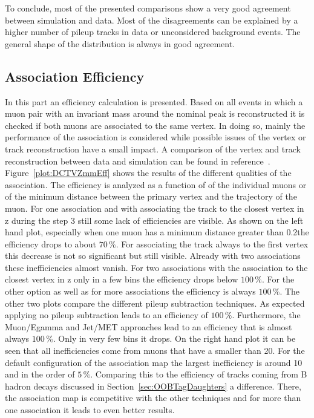 To conclude, most of the presented comparisons show a very good agreement between simulation and data. Most of the disagreements can be explained by a higher number of pileup tracks in data or unconsidered background events. The general shape of the distribution is always in good agreement. 

\subsection{Association Efficiency \label{sec:DCTVAE}}

In this part an efficiency calculation is presented. Based on all events in which a muon pair with an invariant mass around the nominal \Zz peak is reconstructed it is checked if both muons are associated to the same vertex. In doing so, mainly the performance of the association is considered while possible issues of the vertex or track reconstruction have a small impact. A comparison of the vertex and track reconstruction between data and simulation can be found in reference~. Figure~\ref{plot:DCTVZmmEff} shows the results of the different qualities of the association. The efficiency is analyzed as a function of \pt{} of the individual muons or of the minimum distance between the primary vertex and the trajectory of the muon.  For one association and with associating the track to the closest vertex in z during the step 3 still some lack of efficiencies are visible. As shown on the left hand plot, especially when one muon has a minimum distance greater than 0.2\mm the efficiency drops to about $70\,\%$. For associating the track always to the first vertex this decrease is not so significant but still visible. Already with two associations these inefficiencies almost vanish. For two associations with the association to the closest vertex in z only in a few bins the efficiency drops below $100\,\%$. For the other option as well as for more associations the efficiency is always $100\,\%$. The other two plots compare the different pileup subtraction techniques. As expected applying no pileup subtraction leads to an efficiency of $100\,\%$. Furthermore, the Muon/Egamma and Jet/MET approaches lead to an efficiency that is almost always $100\,\%$. Only in very few bins it drops. On the right hand plot it can be seen that all inefficiencies come from muons that have a \pt{} smaller than 20\GeV{}. For the default configuration of the association map the largest inefficiency is around 10\GeV{} and in the order of $5\,\%$. Comparing this to the efficiency of tracks coming from B hadron decays discussed in Section~\ref{sec:OOBTagDaughters} a difference. There, the association map is competitive with the other techniques and for more than one association it leads to even better results.

